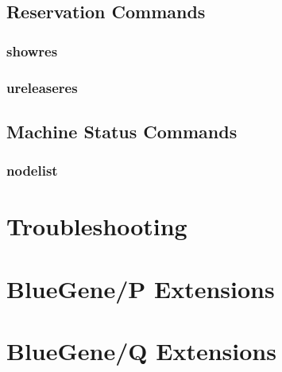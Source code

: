 \documentclass[10pt,letterpaper]{book}
\begin{document}
\section{Reservation Commands}
\subsection{showres}
\subsection{ureleaseres}
\section{Machine Status Commands}
\subsection{nodelist}


\chapter{Troubleshooting}

\appendix
\chapter{BlueGene/P Extensions}
\chapter{BlueGene/Q Extensions}
\end{document}
